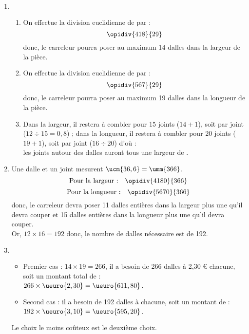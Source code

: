 \ \\ [-5mm]
   \begin{enumerate}
      \item
      \begin{enumerate}
         \item On effectue la division euclidienne de  par  :
            $$\opidiv{418}{29}$$
            donc, {\blue le carreleur pourra poser au maximum 14 dalles dans la largeur de la pièce.}
         \item On effectue la division euclidienne de  par  :
            $$\opidiv{567}{29}$$
            donc, {\blue le carreleur pourra poser au maximum 19 dalles dans la longueur de la pièce.}
         \item Dans la largeur, il restera  à combler pour 15 joints ($14+1$), soit   par joint ($12\div15 =0,8$) ; dans la longueur, il restera  à combler pour $20$ joints ($19+1$), soit  par joint ($16\div20$) d'où : \\
            {\blue les joints autour des dalles auront tous une largeur de }.
      \end{enumerate}
      \item Une dalle et un joint mesurent $\ucm{36,6} =\umm{366}$.
         $$\text{Pour la largeur :} \quad \opidiv{4180}{366}$$
         $$\text{Pour la longueur :} \quad  \opidiv{5670}{366}$$
         donc, le carreleur devra poser 11 dalles entières dans la largeur plus une qu'il devra couper et 15 dalles entières dans la longueur plus une qu'il devra couper. \\
          Or, $12\times16 =192$ donc, {\blue le nombre de dalles nécessaire est de 192}.
      \item
      \begin{itemize}
         \item Premier cas : $14\times19 =266$, il a besoin de 266 dalles à 2,30 \euro{} chacune, soit un montant total de : \\
            $266\times\ueuro{2,30} =\ueuro{611,80}$.
         \item Second cas : il a besoin de 192 dalles à  chacune, soit un montant de : $192\times\ueuro{3,10} =\ueuro{595,20}$.
      \end{itemize}
      {\blue Le choix le moins coûteux est le deuxième choix}.
   \end{enumerate}
